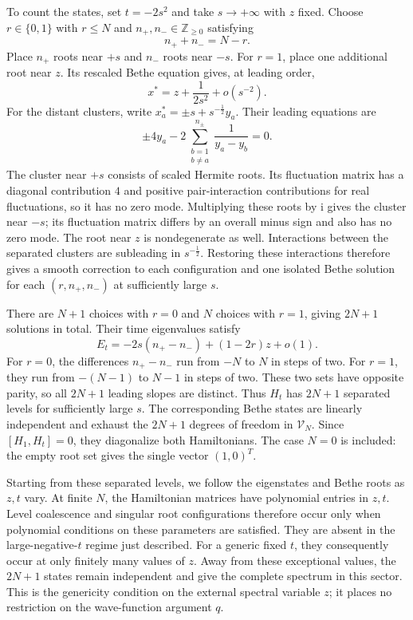 \documentclass[a4paper,11pt]{article}
\numberwithin{equation}{section}
\begin{document}
To count the states, set $t=-2s^{2}$ and take $s\to+\infty$ with
$z$ fixed.  Choose $r\in\{0,1\}$ with $r\leq N$ and
$n_{+},n_{-}\in\mathbb{Z}_{\geq 0}$ satisfying
\begin{equation}
	n_{+}+n_{-}=N-r.
\end{equation}
Place $n_{+}$ roots near $+s$ and $n_{-}$ roots near $-s$.
For $r=1$, place one additional root near $z$.  Its rescaled Bethe
equation gives, at leading order,
\begin{equation}
	x^{*}=z+\frac{1}{2s^{2}}+o(s^{-2}).
\end{equation}
For the distant clusters, write
$x_{a}^{*}=\pm s+s^{-\frac{1}{2}}y_{a}$.  Their leading equations are
\begin{equation}
	\pm 4y_{a}
	-2\sum_{\substack{b=1\\b\neq a}}^{n_{\pm}}
	\frac{1}{y_{a}-y_{b}}=0.
\end{equation}
The cluster near $+s$ consists of scaled Hermite roots.  Its
fluctuation matrix has a diagonal contribution $4$ and positive
pair-interaction contributions for real fluctuations, so it has
no zero mode.  Multiplying these roots by $\mathrm{i}$ gives the
cluster near $-s$; its fluctuation matrix differs by an overall
minus sign and also has no zero mode.  The root near $z$ is
nondegenerate as well.  Interactions between the separated clusters
are subleading in $s^{-\frac{1}{2}}$.  Restoring these interactions
therefore gives a smooth correction to each configuration and one
isolated Bethe solution for each $(r,n_{+},n_{-})$ at sufficiently
large $s$.

There are $N+1$ choices with $r=0$ and $N$ choices with $r=1$,
giving $2N+1$ solutions in total.  Their time eigenvalues satisfy
\begin{equation}
	E_{t}=-2s(n_{+}-n_{-})+(1-2r)z+o(1).
\end{equation}
For $r=0$, the differences $n_{+}-n_{-}$ run from $-N$ to $N$
in steps of two.  For $r=1$, they run from $-(N-1)$ to $N-1$
in steps of two.  These two sets have opposite parity, so all
$2N+1$ leading slopes are distinct.  Thus $H_{t}$ has $2N+1$
separated levels for sufficiently large $s$.  The corresponding
Bethe states are linearly independent and exhaust the $2N+1$
degrees of freedom in $\mathcal{V}_{N}$.  Since
$[H_{1},H_{t}]=0$, they diagonalize both Hamiltonians.
The case $N=0$ is included: the empty root set gives the single
vector $(1,0)^{T}$.

Starting from these separated levels, we follow the eigenstates
and Bethe roots as $z,t$ vary.  At finite $N$, the Hamiltonian
matrices have polynomial entries in $z,t$.  Level coalescence and
singular root configurations therefore occur only when polynomial
conditions on these parameters are satisfied.  They are absent
in the large-negative-$t$ regime just described.  For a generic
fixed $t$, they consequently occur at only finitely many values
of $z$.  Away from these exceptional values, the $2N+1$ states
remain independent and give the complete spectrum in this sector.
This is the genericity condition on the external spectral variable
$z$; it places no restriction on the wave-function argument $q$.
\end{document}
